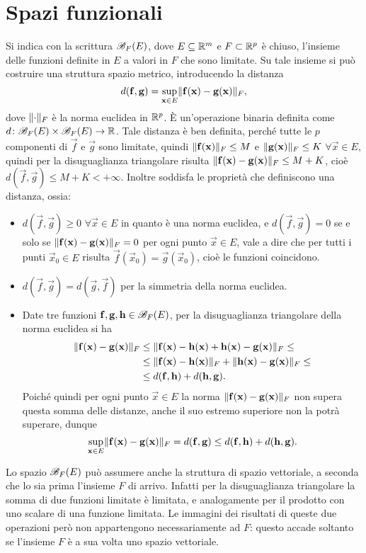 \section{Spazi funzionali}
\label{sec:spazi-funz}
Si indica con la scrittura $\bounded[F]{E}$, dove $E\subseteq\R^m$ e $F\subset\R^p$ è chiuso, l'insieme delle funzioni definite in $E$ a valori in $F$ che sono limitate. Su tale insieme si può costruire una struttura spazio metrico, introducendo la distanza
\[
d(\vec f,\vec g)=\sup_{\vec x\in E}\norm{\vec f(\vec x)-\vec g(\vec x)}_F,
\]
dove $\norm{\cdot}_F$ è la norma euclidea in $\R^p$. È un'operazione binaria definita come $d\colon\bounded[F]{E}\times\bounded[F]{E}\to\R$.
Tale distanza è ben definita, perché tutte le $p$ componenti di $\vec f$ e $\vec g$ sono limitate, quindi $\norm{\vec f(\vec x)}_F\leq M$ e $\norm{\vec g(\vec x)}_F\leq K$ $\forall\vec x\in E$, quindi per la disuguaglianza triangolare risulta $\norm{\vec f(\vec x)-\vec g(\vec x)}_F\leq M+K$, cioè $d(\vec f,\vec g)\leq M+K<+\infty$.
Inoltre soddisfa le proprietà che definiscono una distanza, ossia:
\begin{itemize}
	\item $d(\vec f,\vec g)\ge 0$ $\forall\vec x\in E$ in quanto è una norma euclidea, e $d(\vec f,\vec g)=0$ se e solo se $\norm{\vec f(\vec x)-\vec g(\vec x)}_F=0$ per ogni punto $\vec x\in E$, vale a dire che per tutti i punti $\vec x_0\in E$ risulta $\vec f(\vec x_0)=\vec g(\vec x_0)$, cioè le funzioni coincidono.
	\item $d(\vec f,\vec g)=d(\vec g,\vec f)$ per la simmetria della norma euclidea.
	\item Date tre funzioni $\vec f,\vec g,\vec h\in\bounded[F]{E}$, per la disuguaglianza triangolare della norma euclidea si ha
	\begin{equation}
		\begin{split}
			\norm{\vec f(\vec x)-\vec g(\vec x)}_F&\leq\norm{\vec f(\vec x)-\vec h(\vec x)+\vec h(\vec x)-\vec g(\vec x)}_F\leq\\
			&\leq\norm{\vec f(\vec x)-\vec h(\vec x)}_F+\norm{\vec h(\vec x)-\vec g(\vec x)}_F\leq\\
			&\leq d(\vec f,\vec h)+d(\vec h,\vec g).
		\end{split}
	\end{equation}
Poiché quindi per ogni punto $\vec x\in E$ la norma $\norm{\vec f(\vec x)-\vec g(\vec x)}_F$ non supera questa somma delle distanze, anche il suo estremo superiore non la potrà superare, dunque
\[
\sup_{\vec x\in E}\norm{\vec f(\vec x)-\vec g(\vec x)}_F=d(\vec f,\vec g)\leq d(\vec f,\vec h)+d(\vec h,\vec g).
\]
\end{itemize}
Lo spazio $\bounded[F]{E}$ può assumere anche la struttura di spazio vettoriale, a seconda che lo sia prima l'insieme $F$ di arrivo. Infatti per la disuguaglianza triangolare la somma di due funzioni limitate è limitata, e analogamente per il prodotto con uno scalare di una funzione limitata. Le immagini dei risultati di queste due operazioni però non appartengono necessariamente ad $F$: questo accade soltanto se l'insieme $F$ è a sua volta uno spazio vettoriale.

